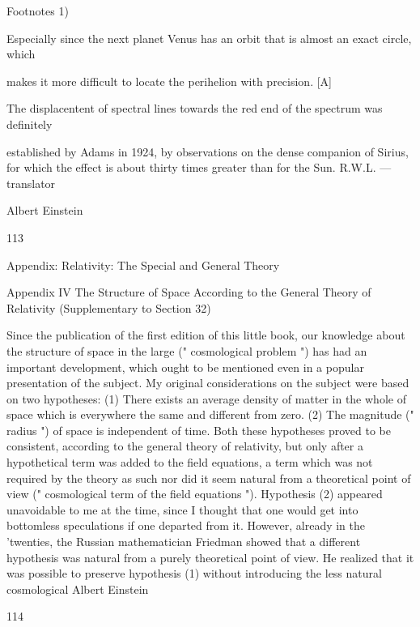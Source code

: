 \documentclass{article}
\begin{document}
Footnotes
1)

Especially since the next planet Venus has an orbit that is almost an exact circle, which

makes it more difficult to locate the perihelion with precision.
[A]

The displacentent of spectral lines towards the red end of the spectrum was definitely

established by Adams in 1924, by observations on the dense companion of Sirius, for which
the effect is about thirty times greater than for the Sun. R.W.L. — translator

Albert Einstein

113

Appendix: Relativity: The Special and General Theory

Appendix IV
The Structure of Space According to the General
Theory of Relativity
(Supplementary to Section 32)

Since the publication of the first edition of this little book, our knowledge about the
structure of space in the large (" cosmological problem ") has had an important
development, which ought to be mentioned even in a popular presentation of the subject.
My original considerations on the subject were based on two hypotheses:
(1) There exists an average density of matter in the whole of space
which is everywhere the same and different from zero.
(2) The magnitude (" radius ") of space is independent of time.
Both these hypotheses proved to be consistent, according to the general theory of
relativity, but only after a hypothetical term was added to the field equations, a term which
was not required by the theory as such nor did it seem natural from a theoretical point of
view (" cosmological term of the field equations ").
Hypothesis (2) appeared unavoidable to me at the time, since I thought that one would
get into bottomless speculations if one departed from it.
However, already in the 'twenties, the Russian mathematician Friedman showed that a
different hypothesis was natural from a purely theoretical point of view. He realized that it
was possible to preserve hypothesis (1) without introducing the less natural cosmological
Albert Einstein

114
\end{document}
